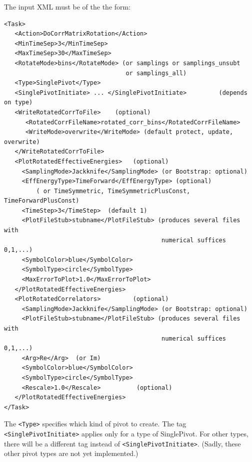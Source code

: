 \documentclass[12pt]{article}
\newcommand{\vb}{\texttt}
\begin{document}
The input XML must be of the the form:
\begin{verbatim}
<Task>
   <Action>DoCorrMatrixRotation</Action>
   <MinTimeSep>3</MinTimeSep>
   <MaxTimeSep>30</MaxTimeSep>
   <RotateMode>bins</RotateMode> (or samplings or samplings_unsubt 
                                  or samplings_all)
   <Type>SinglePivot</Type>
   <SinglePivotInitiate> ... </SinglePivotInitiate>         (depends on type)
   <WriteRotatedCorrToFile>    (optional)
      <RotatedCorrFileName>rotated_corr_bins</RotatedCorrFileName>
      <WriteMode>overwrite</WriteMode> (default protect, update, overwrite)
   </WriteRotatedCorrToFile>
   <PlotRotatedEffectiveEnergies>   (optional)
     <SamplingMode>Jackknife</SamplingMode> (or Bootstrap: optional)
     <EffEnergyType>TimeForward</EffEnergyType> (optional)
         ( or TimeSymmetric, TimeSymmetricPlusConst, TimeForwardPlusConst)
     <TimeStep>3</TimeStep>  (default 1)
     <PlotFileStub>stubname</PlotFileStub> (produces several files with
                                            numerical suffices 0,1,...)
     <SymbolColor>blue</SymbolColor>
     <SymbolType>circle</SymbolType>
     <MaxErrorToPlot>1.0</MaxErrorToPlot>
   </PlotRotatedEffectiveEnergies>
   <PlotRotatedCorrelators>         (optional)
     <SamplingMode>Jackknife</SamplingMode> (or Bootstrap: optional)
     <PlotFileStub>stubname</PlotFileStub> (produces several files with
                                            numerical suffices 0,1,...)
     <Arg>Re</Arg>  (or Im)
     <SymbolColor>blue</SymbolColor>
     <SymbolType>circle</SymbolType>
     <Rescale>1.0</Rescale>          (optional)
   </PlotRotatedEffectiveEnergies>
</Task>
\end{verbatim}
The \vb{<Type>} specifies which kind of pivot to create.  The tag                  
\vb{<SinglePivotInitiate>} applies only for a type of SinglePivot.  For            
other types, there will be a different tag instead of \vb{<SinglePivotInitiate>}.  
(Sadly, these other pivot types are not yet implemented.)
\end{document}
